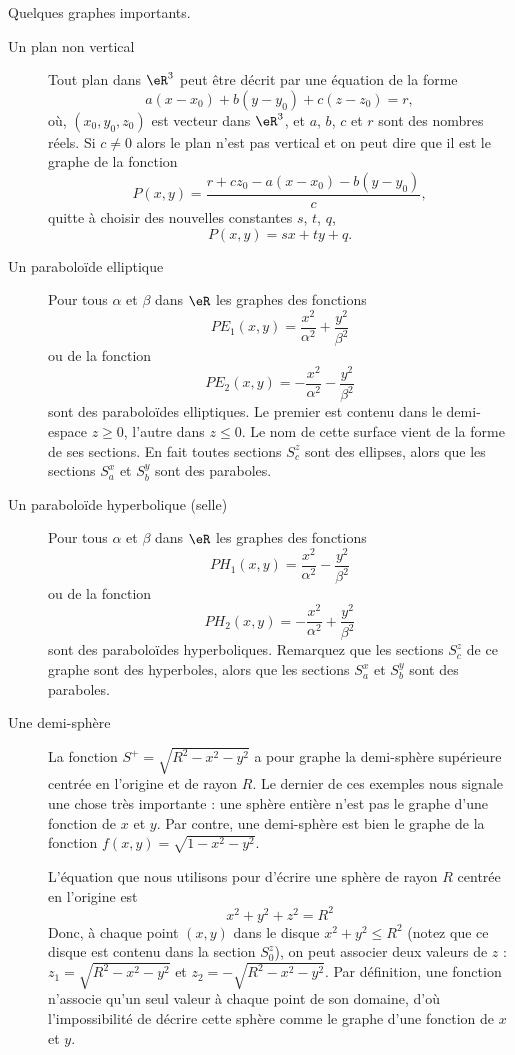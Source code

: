 \begin{example}
	Quelques graphes importants.
	\begin{description}
		\item[Un plan non vertical] Tout plan dans \( \eR^3\) peut être décrit par une équation de la forme
		      \[
			      a(x-x_0)+ b(y-y_0) + c(z-z_0) = r,
		      \]
		      où, \( (x_0, y_0, z_0)\) est vecteur dans \( \eR^3\), et \( a\), \( b\), \( c\) et \( r\) sont des nombres réels. Si \( c\neq 0\) alors le plan n'est pas vertical et on peut dire que il est le graphe de la fonction
		      \[
			      P(x,y)= \frac{r+cz_0 -a(x-x_0)-b(y-y_0)}{c},
		      \]
		      quitte à choisir des nouvelles constantes \( s\), \( t\), \( q\),
		      \[
			      P(x,y)=sx +ty +q.
		      \]
		\item[Un paraboloïde elliptique] Pour tous \( \alpha\) et \( \beta\) dans \( \eR\) les  graphes des fonctions
		      \[
			      PE_1(x,y)=\frac{x^2}{\alpha^2}+\frac{y^2}{\beta^2}
		      \]
		      ou de la fonction
		      \[
			      PE_2(x,y)=-\frac{x^2}{\alpha^2}-\frac{y^2}{\beta^2}
		      \]
		      sont des paraboloïdes elliptiques. Le premier est contenu dans le demi-espace \( z\geq 0\), l'autre dans \( z\leq 0\). Le nom de cette surface vient de la forme de ses sections. En fait toutes  sections \( S^z_c\) sont des ellipses, alors que les sections \( S^x_a\) et \( S^y_b\) sont des paraboles.
		\item[Un paraboloïde hyperbolique (selle)]  Pour tous \( \alpha\) et \( \beta\) dans \( \eR\) les  graphes des fonctions
		      \[
			      PH_1(x,y)=\frac{x^2}{\alpha^2}-\frac{y^2}{\beta^2}
		      \]
		      ou de la fonction
		      \[
			      PH_2(x,y)=-\frac{x^2}{\alpha^2}+\frac{y^2}{\beta^2}
		      \]
		      sont des paraboloïdes hyperboliques. Remarquez que les  sections \( S^z_c\) de ce graphe sont des hyperboles, alors que les sections \( S^x_a\) et \( S^y_b\) sont des paraboles.
		\item[Une demi-sphère] La fonction \( S^+=\sqrt{R^2-x^2-y^2}\) a pour graphe la demi-sphère supérieure centrée en l'origine et de rayon \( R\).
		      Le dernier de ces exemples nous signale une chose très importante : une sphère entière n'est pas le graphe d'une fonction de \( x\) et \( y\). Par contre, une demi-sphère est bien le graphe de la fonction \( f(x,y)=\sqrt{1-x^2-y^2}\).

		      L'équation que nous utilisons  pour d'écrire une sphère de rayon \( R\) centrée en l'origine est
		      \[
			      x^2+y^2+z^2=R^2
		      \]
		      Donc, à  chaque point  \( (x,y)\) dans le disque \( x^2+y^2\leq R^2\) (notez que ce disque est contenu dans la section \( S^z_0\)), on peut associer deux valeurs de \( z\) : \( z_1=\sqrt{R^2-x^2-y^2}\) et  \( z_2=-\sqrt{R^2-x^2-y^2}\). Par définition, une fonction n'associe qu'un seul valeur à chaque point de son domaine, d'où l'impossibilité de décrire cette sphère comme le graphe d'une fonction de \( x\) et \( y\).

	\end{description}
\end{example}

